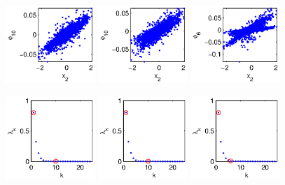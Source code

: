 \begin{figure}[t]
\includegraphics[width=0.3\textwidth]{data_linear_fast1}
\includegraphics[width=0.3\textwidth]{data_linear_fast2}
\includegraphics[width=0.3\textwidth]{data_linear_fast3}

\includegraphics[width=0.3\textwidth]{data_linear_evals1}
\includegraphics[width=0.3\textwidth]{data_linear_evals2}
\includegraphics[width=0.3\textwidth]{data_linear_evals3}


\end{figure}
